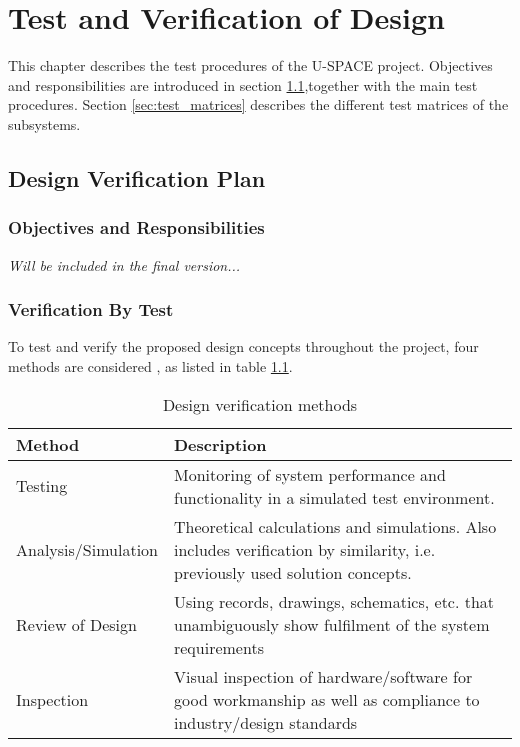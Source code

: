 \chapter{Test and Verification of Design}
\label{chap:test_verification}

This chapter describes the test procedures of the \ac{U-SPACE} project. Objectives and responsibilities are introduced in section \ref{sec:ver_plan},together with the main test procedures. Section \ref{sec:test_matrices} describes the different test matrices of the subsystems.

\section{Design Verification Plan}
\label{sec:ver_plan}

\subsection{Objectives and Responsibilities}

\textit{Will be included in the final version...}



\subsection{Verification By Test}


To test and verify the proposed design concepts throughout the project, four methods are considered \cite{ECSS_verification}, as listed in table \ref{tab:verification_methods}.

\begin{table}[h]
\centering
\caption{Design verification methods}
\label{tab:verification_methods}
\begin{tabular}{p{}p{}}
\hline
\textbf{Method} & \textbf{Description}\\
\hline
Testing & Monitoring of system performance and functionality in a simulated test environment.\\[2mm]
Analysis/Simulation & Theoretical calculations and simulations. Also includes verification by similarity, i.e. previously used solution concepts.\\[2mm]
Review of Design & Using records, drawings, schematics, etc. that unambiguously show fulfilment of the system requirements\\[2mm]
Inspection & Visual inspection of hardware/software for good workmanship as well as compliance to industry/design standards\\
\hline
\end{tabular}
\end{table}

